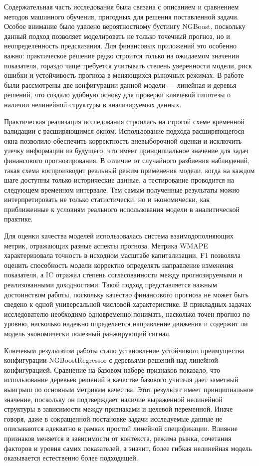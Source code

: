 \documentclass[
]{article}
\begin{document}
Содержательная часть исследования была связана с описанием и сравнением методов машинного обучения, пригодных для решения поставленной задачи. Особое внимание было уделено вероятностному бустингу NGBoost, поскольку данный подход позволяет моделировать не только точечный прогноз, но и неопределенность предсказания. Для финансовых приложений это особенно важно: практическое решение редко строится только на ожидаемом значении показателя, гораздо чаще требуется учитывать степень уверенности модели, риск ошибки и устойчивость прогноза в меняющихся рыночных режимах. В работе были рассмотрены две конфигурации данной модели --- линейная и деревья решений, что создало удобную основу для проверки ключевой гипотезы о наличии нелинейной структуры в анализируемых данных.

Практическая реализация исследования строилась на строгой схеме временной валидации с расширяющимся окном. Использование подхода расширяющегося окна позволило обеспечить корректность вневыборочной оценки и исключить утечку информации из будущего, что имеет принципиальное значение для задач финансового прогнозирования. В отличие от случайного разбиения наблюдений, такая схема воспроизводит реальный режим применения модели, когда на каждом шаге доступны только исторические данные, а тестирование проводится на следующем временном интервале. Тем самым полученные результаты можно интерпретировать не только статистически, но и экономически, как приближенные к условиям реального использования модели в аналитической практике.

Для оценки качества моделей использовалась система взаимодополняющих метрик, отражающих разные аспекты прогноза. Метрика WMAPE характеризовала точность в исходном масштабе капитализации, F1 позволяла оценить способность модели корректно определять направление изменения показателя, а IC отражал степень согласованности между прогнозируемыми и реализованными доходностями. Такой подход представляется важным достоинством работы, поскольку качество финансового прогноза не может быть сведено к одной универсальной числовой характеристике. В прикладных задачах исследователю необходимо одновременно понимать, насколько точен прогноз по уровню, насколько надежно определяется направление движения и содержит ли модель экономически полезный ранжирующий сигнал.

Ключевым результатом работы стало установление устойчивого преимущества конфигурации NGBoostRegressor с деревьями решений над линейной конфигурацией. Сравнение на базовом наборе признаков показало, что использование деревьев решений в качестве базового учителя дает заметный выигрыш по основным метрикам качества. Этот результат имеет принципиальное значение, поскольку он подтверждает наличие выраженной нелинейной структуры в зависимости между признаками и целевой переменной. Иначе говоря, даже в сокращенной постановке задачи исследуемые данные не описываются адекватно в рамках простой линейной спецификации. Влияние признаков меняется в зависимости от контекста, режима рынка, сочетания факторов и уровня самих показателей, а значит, более гибкая нелинейная модель оказывается естественно более подходящей.
\end{document}
